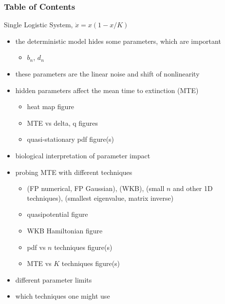\documentclass[8pt]{beamer}
\begin{document}
\begin{frame}
\frametitle{Table of Contents}
Single Logistic System, $\dot{x}=x(1-x/K)$
	\begin{itemize}
		\item the deterministic model hides some parameters, which are important
		\begin{itemize}
			\item $b_n$, $d_n$
		\end{itemize}
		\item these parameters are the linear noise and shift of nonlinearity
		\item hidden parameters affect the mean time to extinction (MTE)
		\begin{itemize}
			\item heat map figure
			\item MTE vs delta, q figures
			\item quasi-stationary pdf figure(s)
		\end{itemize}
		\item biological interpretation of parameter impact
		\item probing MTE with different techniques
		\begin{itemize}
			\item (FP numerical, FP Gaussian), (WKB), (small $n$ and other 1D techniques), (smallest eigenvalue, matrix inverse)
			\item quasipotential figure
			\item WKB Hamiltonian figure
			\item pdf vs $n$ techniques figure(s)
			\item MTE vs $K$ techniques figure(s)
		\end{itemize}
		\item different parameter limits
		\item which techniques one might use
	\end{itemize}
\end{frame}
\end{document}
